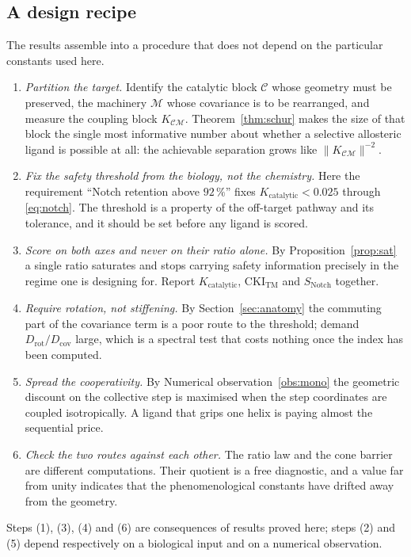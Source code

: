 \documentclass[11pt,reqno]{amsart}
\theoremstyle{plain}
\theoremstyle{definition}
\theoremstyle{remark}
\numberwithin{equation}{section}
\newcommand{\CKI}{\mathrm{CKI}}
\newcommand{\Kcat}{K_{\mathrm{catalytic}}}
\newcommand{\CKItm}{\CKI_{\mathrm{TM}}}
\newcommand{\Snotch}{S_{\mathrm{Notch}}}
\newcommand{\CC}{\mathcal{C}}
\newcommand{\MM}{\mathcal{M}}
\begin{document}
\subsection{A design recipe}
\label{sec:recipe}
The results assemble into a procedure that does not depend on the particular constants used here.

\begin{enumerate}[label=\textup{(\arabic*)},leftmargin=2.4em,itemsep=4pt]
\item \emph{Partition the target.} Identify the catalytic block $\CC$ whose geometry must be preserved, the machinery $\MM$ whose covariance is to be rearranged, and measure the coupling block $K_{\CC\MM}$. Theorem~\ref{thm:schur} makes the size of that block the single most informative number about whether a selective allosteric ligand is possible at all: the achievable separation grows like $\|K_{\CC\MM}\|^{-2}$.
\item \emph{Fix the safety threshold from the biology, not the chemistry.} Here the requirement ``Notch retention above $92\,\%$'' fixes $\Kcat<0.025$ through \eqref{eq:notch}. The threshold is a property of the off-target pathway and its tolerance, and it should be set before any ligand is scored.
\item \emph{Score on both axes and never on their ratio alone.} By Proposition~\ref{prop:sat} a single ratio saturates and stops carrying safety information precisely in the regime one is designing for. Report $\Kcat$, $\CKItm$ and $\Snotch$ together.
\item \emph{Require rotation, not stiffening.} By Section~\ref{sec:anatomy} the commuting part of the covariance term is a poor route to the threshold; demand $D_{\mathrm{rot}}/D_{\mathrm{cov}}$ large, which is a spectral test that costs nothing once the index has been computed.
\item \emph{Spread the cooperativity.} By Numerical observation~\ref{obs:mono} the geometric discount on the collective step is maximised when the step coordinates are coupled isotropically. A ligand that grips one helix is paying almost the sequential price.
\item \emph{Check the two routes against each other.} The ratio law and the cone barrier are different computations. Their quotient is a free diagnostic, and a value far from unity indicates that the phenomenological constants have drifted away from the geometry.
\end{enumerate}

Steps (1), (3), (4) and (6) are consequences of results proved here; steps (2) and (5) depend respectively on a biological input and on a numerical observation.
\end{document}
